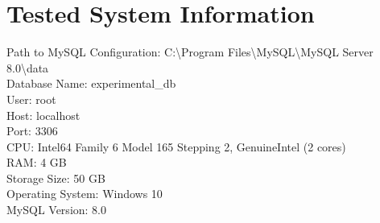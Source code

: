 
            \newpage
            \section*{Tested System Information}
            \noindent Path to MySQL Configuration: C:\textbackslash{}Program Files\textbackslash{}MySQL\textbackslash{}MySQL Server 8.0\textbackslash{}data \\
            Database Name: experimental\_db \\
            User: root \\
            Host: localhost \\
            Port: 3306 \\
            CPU: Intel64 Family 6 Model 165 Stepping 2, GenuineIntel (2 cores) \\
            RAM: 4 GB \\
            Storage Size: 50 GB \\
            Operating System: Windows 10 \\
            MySQL Version: 8.0
                
